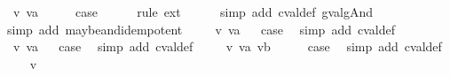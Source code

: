 \begin{isabellebody}
\isamarkupfalse%
\isanewline
{}\isamarkupfalse%
\ {\isacharparenleft}{\isachardoublequoteopen}{}{\isacharunderscore}{}{}{\isachardoublequoteclose}\ v\ va{\isacharparenright}\isanewline
\ \ \isamarkupfalse%
\ \isamarkupfalse%
\ {\isacharquery}case\isanewline
\ \ \ \ \isamarkupfalse%
\ {\isacharparenleft}rule\ ext{\isacharparenright}{\isacharplus}\isanewline
\ \ \ \ \isamarkupfalse%
\ {\isacharparenleft}simp\ add{\isacharcolon}\ cval{\isacharunderscore}def\ gval{\isacharunderscore}gAnd{\isacharparenright}\isanewline
\ \ \ \ \isamarkupfalse%
\ {\isacharparenleft}simp\ add{\isacharcolon}\ maybe{\isacharunderscore}and{\isacharunderscore}idempotent{\isacharparenright}\isanewline
{}\isamarkupfalse%
\isanewline
\ \ \isamarkupfalse%
\ {\isacharparenleft}{\isachardoublequoteopen}{}{\isacharunderscore}{}{}{\isachardoublequoteclose}\ v\ va{\isacharparenright}\isanewline
{}\isamarkupfalse%
\ \isamarkupfalse%
\ {\isacharquery}case\ \isamarkupfalse%
\ {\isacharparenleft}simp\ add{\isacharcolon}\ cval{\isacharunderscore}def{\isacharparenright}\isanewline
{}\isamarkupfalse%
\isanewline
\ \ \isamarkupfalse%
\ {\isacharparenleft}{\isachardoublequoteopen}{}{\isacharunderscore}{}{}{\isachardoublequoteclose}\ v\ va{\isacharparenright}\isanewline
{}\isamarkupfalse%
\ \isamarkupfalse%
\ {\isacharquery}case\ \isamarkupfalse%
\ {\isacharparenleft}simp\ add{\isacharcolon}\ cval{\isacharunderscore}def{\isacharparenright}\isanewline
{}\isamarkupfalse%
\isanewline
\ \ \isamarkupfalse%
\ {\isacharparenleft}{\isachardoublequoteopen}{}{\isacharunderscore}{}{}{\isachardoublequoteclose}\ v\ va\ vb{\isacharparenright}\isanewline
\ \ \isamarkupfalse%
\ \isamarkupfalse%
\ {\isacharquery}case\ \isamarkupfalse%
\ {\isacharparenleft}simp\ add{\isacharcolon}\ cval{\isacharunderscore}def{\isacharparenright}\isanewline
{}\isamarkupfalse%
\isanewline
\ \ \isamarkupfalse%
\ {\isacharparenleft}{\isachardoublequoteopen}{}{\isacharunderscore}{}{}{\isachardoublequoteclose}\ v{\isacharparenright}\isanewline
\ \ \isamarkupfalse%
\ \isamarkupfalse%

\end{isabellebody}
